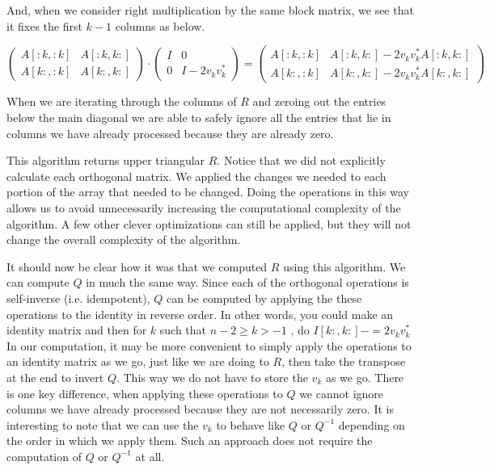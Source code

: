 And, when we consider right multiplication by the same block matrix, we see that it fixes the first $k-1$ columns as below.

\[
\begin{pmatrix}
A[:k,:k] & A[:k,k:] \\
A[k:,:k] & A[k:,k:]
\end{pmatrix}
\cdot
\begin{pmatrix}
I & 0 \\
0 & I - 2 v_k v_k^\ast
\end{pmatrix}
=
\begin{pmatrix}
A[:k,:k] & A[:k,k:] - 2 v_k v_k^\ast A[:k,k:] \\
A[k:,:k] & A[k:,k:] - 2 v_k v_k^\ast A[k:,k:]
\end{pmatrix}
\]

When we are iterating through the columns of $R$ and zeroing out the entries below the main diagonal we are able to safely ignore all the entries that lie in columns we have already processed because they are already zero.

This algorithm returns upper triangular $R$.
Notice that we did not explicitly calculate each orthogonal matrix.
We applied the changes we needed to each portion of the array that needed to be changed.
Doing the operations in this way allows us to avoid unnecessarily increasing the computational complexity of the algorithm.
A few other clever optimizations can still be applied, but they will not change the overall complexity of the algorithm.

It should now be clear how it was that we computed $R$ using this algorithm.
We can compute $Q$ in much the same way.
Since each of the orthogonal operations is self-inverse (i.e. idempotent), $Q$ can be computed by applying the these operations to the identity in reverse order.
In other words, you could make an identity matrix and then for $k$ such that $n-2 \geq k > -1$ , do $I[k:,k:] -= 2 v_k v_k^\ast$
In our computation, it may be more convenient to simply apply the operations to an identity matrix as we go, just like we are doing to $R$, then take the transpose at the end to invert $Q$.
This way we do not have to store the $v_k$ as we go.
There is one key difference, when applying these operations to $Q$ we cannot ignore columns we have already processed because they are not necessarily zero.
It is interesting to note that we can use the $v_k$ to behave like $Q$ or $Q^{-1}$ depending on the order in which we apply them.
Such an approach does not require the computation of $Q$ or $Q^{-1}$ at all.

